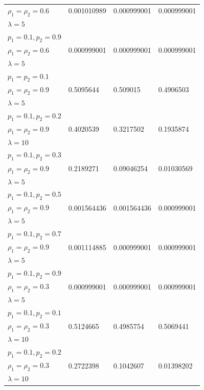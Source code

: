 \documentclass[12pt,oneside]{report}
\theoremstyle{definition}
\theoremstyle{mystyle}
\begin{document}
\begin{landscape}
\begin{center}
\begin{longtable}[h!]{|l|l|l| l|}
			$ \rho_{1}=\rho_{2}=0.6 $  &0.001010989  &0.000999001  &0.000999001\\
			$\lambda=5$ &  &  &\\ \hline
			$ p_{1}=0.1,p_{2}=0.9$ & & & \\
			$ \rho_{1}=\rho_{2}=0.6 $  &0.000999001  &0.000999001   &0.000999001 \\
			$\lambda=5$ &  &  &\\ \hline
			$ p_{1}=p_{2}=0.1 $ &  & & \\
			$ \rho_{1}=\rho_{2}=0.9 $ &0.5095644 & 0.509015 &0.4906503 \\
			$\lambda=5$ &  &  &\\ \hline
			$ p_{1}=0.1,p_{2}=0.2 $  &  & &\\
			$ \rho_{1}=\rho_{2}=0.9 $  & 0.4020539 & 0.3217502 &0.1935874 \\
			$\lambda=10$ &  &  &\\ \hline
			$ p_{1}=0.1,p_{2}=0.3 $ &  & & \\
			$ \rho_{1}=\rho_{2}=0.9 $  &0.2189271  & 0.09046254 & 0.01030569\\
			$\lambda=5$ &  & & \\ \hline
			$ p_{1}=0.1,p_{2}=0.5 $ &&&\\
			$ \rho_{1}=\rho_{2}=0.9 $ &0.001564436  &0.001564436  &0.000999001\\
			$\lambda=5$ &  &  &\\ \hline
			$ p_{1}=0.1,p_{2}=0.7$ &  &  &\\
			$ \rho_{1}=\rho_{2}=0.9 $  & 0.001114885  &0.000999001  &0.000999001 \\
			$\lambda=5$ &  &  &\\ \hline
			$ p_{1}=0.1,p_{2}=0.9$ &  &  &\\
			$ \rho_{1}=\rho_{2}=0.3 $  &0.000999001  &0.000999001  &0.000999001\\
			$\lambda=5$ &  &  &\\ \hline
			$ p_{1}=0.1,p_{2}=0.1$ &  & & \\
			$ \rho_{1}=\rho_{2}=0.3 $  &0.5124665  &0.4985754 &0.5069441 \\
			$\lambda=10$ &  &  &\\ \hline
			$ p_{1}=0.1,p_{2}=0.2$ &  &  & \\ 
			$ \rho_{1}=\rho_{2}=0.3 $  &0.2722398  &0.1042607 &0.01398202 \\
			$\lambda=10$ &  &  &\\ \hline

\end{longtable}
\end{center}
\end{landscape}
\end{document}
